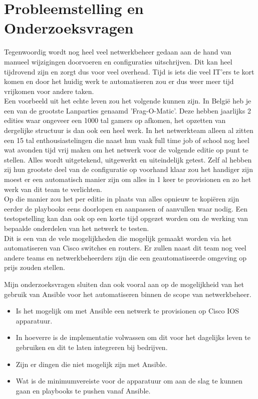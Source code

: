 \section{Probleemstelling en Onderzoeksvragen}
\label{sec:onderzoeksvragen}
Tegenwoordig wordt nog heel veel netwerkbeheer gedaan aan de hand van manueel wijzigingen doorvoeren en configuraties uitschrijven. Dit kan heel tijdrovend zijn en zorgt dus voor veel overhead. Tijd is iets die veel IT'ers te kort komen en door het huidig werk te automatiseren zou er dus weer meer tijd vrijkomen voor andere taken.
\\

Een voorbeeld uit het echte leven zou het volgende kunnen zijn.
In België heb je een van de grootste Lanparties genaamd 'Frag-O-Matic'. Deze hebben jaarlijks 2 edities waar ongeveer een 1000 tal gamers op afkomen, het opzetten van dergelijke structuur is dan ook een heel werk. In het netwerkteam alleen al zitten een 15 tal enthousiastelingen die naast hun vaak full time job of school nog heel wat avonden tijd vrij maken om het netwerk voor de volgende editie op punt te stellen. Alles wordt uitgetekend, uitgewerkt en uiteindelijk getest. Zelf al hebben zij hun grootste deel van de configuratie op voorhand klaar zou het handiger zijn moest er een automatisch manier zijn om alles in 1 keer te provisionen en zo het werk van dit team te verlichten. 
\\

Op die manier zou het per editie in plaats van alles opnieuw te kopiëren zijn eerder de playbooks eens doorlopen en aanpassen of aanvullen waar nodig. Een testopstelling kan dan ook op een korte tijd opgezet worden om de werking van bepaalde onderdelen van het netwerk te testen.
\\

Dit is een van de vele mogelijkheden die mogelijk gemaakt worden via het automatiseren van Cisco switches en routers. Er zullen naast dit team nog veel andere teams en netwerkbeheerders zijn die een geautomatiseerde omgeving op prijs zouden stellen.

Mijn onderzoeksvragen sluiten dan ook vooral aan op de mogelijkheid van het gebruik van Ansible voor het automatiseren binnen de scope van netwerkbeheer.
\begin{itemize}
\item Is het mogelijk om met Ansible een netwerk te provisionen op Cisco IOS apparatuur.
\item In hoeverre is de implementatie volwassen om dit voor het dagelijks leven te gebruiken en dit te laten integreren bij bedrijven.
\item Zijn er dingen die niet mogelijk zijn met Ansible.
\item Wat is de minimumvereiste voor de apparatuur om aan de slag te kunnen gaan en playbooks te pushen vanaf Ansible.
\\
\end{itemize}


